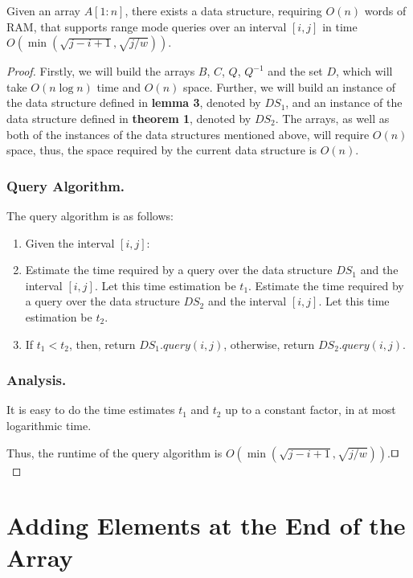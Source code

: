 \documentclass[runningheads]{llncs}
\begin{document}
\begin{theorem}
    Given an array $A[1:n]$, there exists a data structure, requiring $O(n)$ words of RAM, that supports 
    range mode queries over an interval $[i,j]$ in time $O(\min ( \sqrt{j-i+1}, \sqrt{j/w} ) )$.    
\end{theorem}
\begin{proof}
    Firstly, we will build the arrays $B$, $C$, $Q$, $Q^{-1}$ and the set $D$, which will take $O(n\log n)$ time and $O(n)$ space.
    Further, we will build an instance of the data structure defined in \textbf{lemma 3}, denoted by $DS_1$, and an instance of the data structure defined in \textbf{theorem 1}, denoted by $DS_2$.
    The arrays, as well as both of the instances of the data structures mentioned above, will require $O(n)$ space, thus, the space required by the current data structure is $O(n)$.
    
    \subsubsection{Query Algorithm.} The query algorithm is as follows:
    \begin{enumerate}
        \item[] Given the interval $[i,j]$:
        
        \item Estimate the time required by a query over the data structure $DS_1$ and the interval $[i,j]$. Let this time estimation be $t_1$. 
              Estimate the time required by a query over the data structure $DS_2$ and the interval $[i,j]$. Let this time estimation be $t_2$. 
        
        \item If $t_1<t_2$, then, return $DS_1.query(i,j)$, otherwise, return $DS_2.query(i,j)$.      
    
    \end{enumerate}

    \subsubsection{Analysis.}
    It is easy to do the time estimates $t_1$ and $t_2$ up to a constant factor, in at most logarithmic time.
    
    Thus, the runtime of the query algorithm is $O(\min ( \sqrt{j-i+1}, \sqrt{j/w} ) )$.$\qed$

\end{proof}


\section{Adding Elements at the End of the Array}
\end{document}
